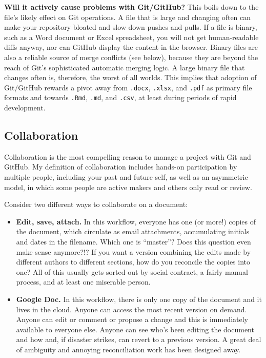 \documentclass[12pt]{article}
\begin{document}
\textbf{Will it actively cause problems with Git/GitHub?} This boils
down to the file's likely effect on Git operations. A file that is large
and changing often can make your repository bloated and slow down pushes
and pulls. If a file is binary, such as a Word document or Excel
spreadsheet, you will not get human-readable diffs anyway, nor can
GitHub display the content in the browser. Binary files are also a
reliable source of merge conflicts (see below), because they are beyond
the reach of Git's sophisticated automatic merging logic. A large binary
file that changes often is, therefore, the worst of all worlds. This
implies that adoption of Git/GitHub rewards a pivot away from
\texttt{.docx}, \texttt{.xlsx}, and \texttt{.pdf} as primary file
formats and towards \texttt{.Rmd}, \texttt{.md}, and \texttt{.csv}, at
least during periods of rapid development.

\subsection{Collaboration}\label{collaboration}

Collaboration is the most compelling reason to manage a project with Git
and GitHub. My definition of collaboration includes hands-on
participation by multiple people, including your past and future self,
as well as an asymmetric model, in which some people are active makers
and others only read or review.

Consider two different ways to collaborate on a document:

\begin{itemize}
\item
  \textbf{Edit, save, attach.} In this workflow, everyone has one (or
  more!) copies of the document, which circulate as email attachments,
  accumulating initials and dates in the filename. Which one is
  ``master''? Does this question even make sense anymore?!? If you want
  a version combining the edits made by different authors to different
  sections, how do you reconcile the copies into one? All of this
  usually gets sorted out by social contract, a fairly manual process,
  and at least one miserable person.
\item
  \textbf{Google Doc.} In this workflow, there is only one copy of the
  document and it lives in the cloud. Anyone can access the most recent
  version on demand. Anyone can edit or comment or propose a change and
  this is immediately available to everyone else. Anyone can see who's
  been editing the document and how and, if disaster strikes, can revert
  to a previous version. A great deal of ambiguity and annoying
  reconciliation work has been designed away.
\end{itemize}
\end{document}
